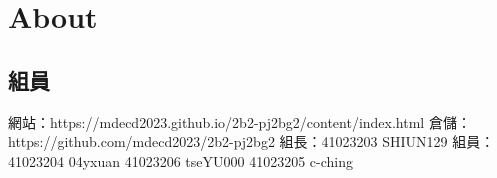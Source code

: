 \chapter{About}
\renewcommand{\baselinestretch}{10.0} %
\setcounter{page}{1}  %
\fontsize{14pt}{2.5pt}\sectionef
\section{組員}
網站：https://mdecd2023.github.io/2b2-pj2bg2/content/index.html
倉儲：https://github.com/mdecd2023/2b2-pj2bg2
組長：41023203  SHIUN129
組員：41023204  04yxuan   41023206 tseYU000   41023205  c-ching


\renewcommand{\baselinestretch}{0.5} %
